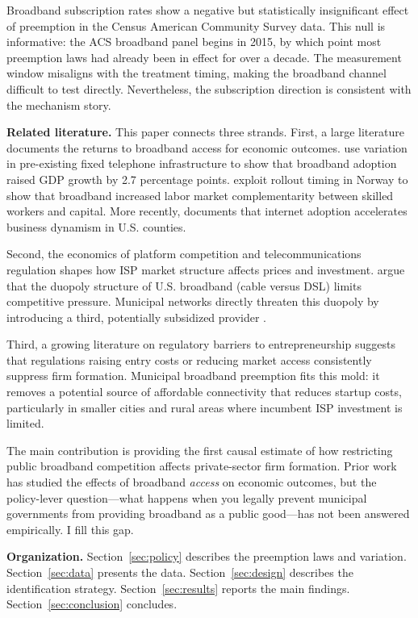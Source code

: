 \documentclass[12pt]{article}
\begin{document}
Broadband subscription rates show a negative but statistically insignificant effect of preemption in the Census American Community Survey data. This null is informative: the ACS broadband panel begins in 2015, by which point most preemption laws had already been in effect for over a decade. The measurement window misaligns with the treatment timing, making the broadband channel difficult to test directly. Nevertheless, the subscription direction is consistent with the mechanism story.

\textbf{Related literature.} This paper connects three strands. First, a large literature documents the returns to broadband access for economic outcomes. \citet{czernich2011broadband} use variation in pre-existing fixed telephone infrastructure to show that broadband adoption raised GDP growth by 2.7 percentage points. \citet{akerman2015broadband} exploit rollout timing in Norway to show that broadband increased labor market complementarity between skilled workers and capital. More recently, \citet{furman2017broadband} documents that internet adoption accelerates business dynamism in U.S. counties.

Second, the economics of platform competition and telecommunications regulation shapes how ISP market structure affects prices and investment. \citet{economides2008broadband} argue that the duopoly structure of U.S. broadband (cable versus DSL) limits competitive pressure. Municipal networks directly threaten this duopoly by introducing a third, potentially subsidized provider \citep{nuechterlein2005digital}.

Third, a growing literature on regulatory barriers to entrepreneurship \citep{djankov2002regulation,klapper2006entry} suggests that regulations raising entry costs or reducing market access consistently suppress firm formation. Municipal broadband preemption fits this mold: it removes a potential source of affordable connectivity that reduces startup costs, particularly in smaller cities and rural areas where incumbent ISP investment is limited.

The main contribution is providing the first causal estimate of how restricting public broadband competition affects private-sector firm formation. Prior work has studied the effects of broadband \textit{access} on economic outcomes, but the policy-lever question---what happens when you legally prevent municipal governments from providing broadband as a public good---has not been answered empirically. I fill this gap.

\textbf{Organization.} Section~\ref{sec:policy} describes the preemption laws and variation. Section~\ref{sec:data} presents the data. Section~\ref{sec:design} describes the identification strategy. Section~\ref{sec:results} reports the main findings. Section~\ref{sec:conclusion} concludes.
\end{document}
